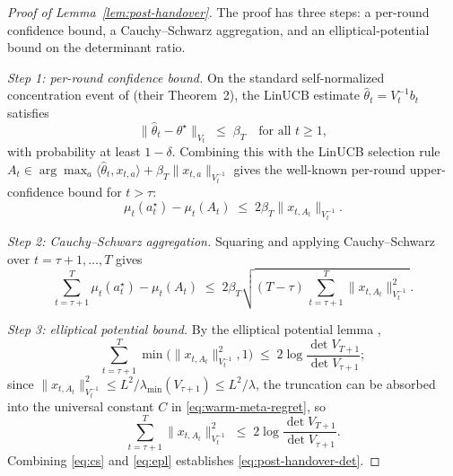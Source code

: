 \documentclass{article}
\theoremstyle{definition}
\theoremstyle{remark}
\theoremstyle{remark}
\begin{document}
\begin{proof}[Proof of Lemma~\ref{lem:post-handover}]
The proof has three steps: a per-round confidence bound, a Cauchy--Schwarz
aggregation, and an elliptical-potential bound on the determinant ratio.

\emph{Step 1: per-round confidence bound.}
On the standard self-normalized concentration event of
\cite{abbasi2011improved} (their Theorem~2), the LinUCB estimate
$\widehat{\theta}_t=V_t^{-1}b_t$ satisfies
\[
\|\widehat{\theta}_t-\theta^\star\|_{V_t}
\;\le\;\beta_T
\quad\text{for all }t\ge 1,
\]
with probability at least $1-\delta$. Combining this with the LinUCB
selection rule
$A_t\in\arg\max_{a}\langle\widehat{\theta}_t,x_{t,a}\rangle+\beta_T\|x_{t,a}\|_{V_t^{-1}}$
gives the well-known per-round upper-confidence bound for $t>\tau$:
\begin{equation}
\label{eq:linucb-per-round}
\mu_t(a_t^\star)-\mu_t(A_t)
\;\le\;
2\beta_T\|x_{t,A_t}\|_{V_t^{-1}}.
\end{equation}

\emph{Step 2: Cauchy--Schwarz aggregation.}
Squaring and applying Cauchy--Schwarz over $t=\tau+1,\dots,T$ gives
\begin{equation}
\label{eq:cs}
\sum_{t=\tau+1}^{T}\!\!
\mu_t(a_t^\star)-\mu_t(A_t)
\;\le\;
2\beta_T
\sqrt{(T-\tau)\,\sum_{t=\tau+1}^{T}\|x_{t,A_t}\|_{V_t^{-1}}^{2}}.
\end{equation}

\emph{Step 3: elliptical potential bound.}
By the elliptical potential lemma \cite[Lemma~11]{abbasi2011improved},
\[
\sum_{t=\tau+1}^T\min\!\bigl(\|x_{t,A_t}\|_{V_t^{-1}}^2,1\bigr)
\;\le\; 2\log\frac{\det V_{T+1}}{\det V_{\tau+1}};
\]
since $\|x_{t,A_t}\|_{V_t^{-1}}^2\le L^2/\lambda_{\min}(V_{\tau+1})\le L^2/\lambda$,
the truncation can be absorbed into the universal constant $C$ in
\eqref{eq:warm-meta-regret}, so
\begin{equation}
\label{eq:epl}
\sum_{t=\tau+1}^{T}\|x_{t,A_t}\|_{V_t^{-1}}^{2}
\;\le\;
2\log\dfrac{\det V_{T+1}}{\det V_{\tau+1}}.
\end{equation}
Combining \eqref{eq:cs} and \eqref{eq:epl} establishes
\eqref{eq:post-handover-det}.


\end{proof}
\end{document}
